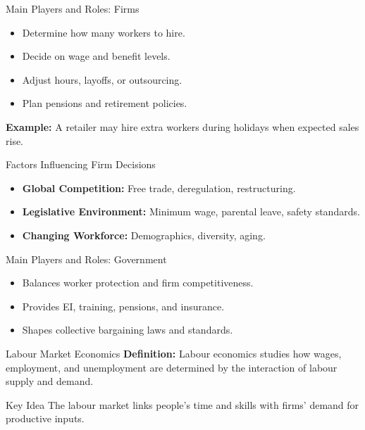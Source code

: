 \documentclass[aspectratio=169]{beamer}
\begin{document}
\begin{frame}{Main Players and Roles: Firms}
\begin{itemize}
  \item Determine how many workers to hire.
  \item Decide on wage and benefit levels.
  \item Adjust hours, layoffs, or outsourcing.
  \item Plan pensions and retirement policies.
\end{itemize}
\textbf{Example:} A retailer may hire extra workers during holidays when expected sales rise.
\end{frame}

\begin{frame}{Factors Influencing Firm Decisions}
\begin{itemize}
  \item \textbf{Global Competition:} Free trade, deregulation, restructuring.
  \item \textbf{Legislative Environment:} Minimum wage, parental leave, safety standards.
  \item \textbf{Changing Workforce:} Demographics, diversity, aging.
\end{itemize}
\end{frame}

\begin{frame}{Main Players and Roles: Government}
\begin{itemize}
  \item Balances worker protection and firm competitiveness.
  \item Provides EI, training, pensions, and insurance.
  \item Shapes collective bargaining laws and standards.
\end{itemize}
\end{frame}

\begin{frame}{Labour Market Economics}
\textbf{Definition:} Labour economics studies how wages, employment, and unemployment are determined by the interaction of labour supply and demand.
\begin{block}{Key Idea}
The labour market links people’s time and skills with firms’ demand for productive inputs.
\end{block}
\end{frame}
\end{document}
